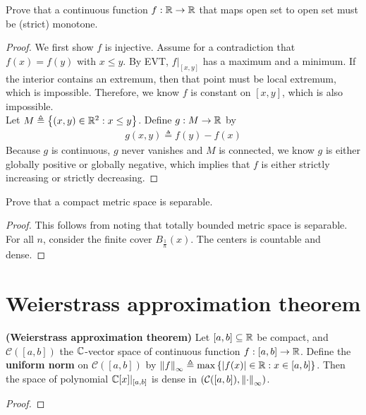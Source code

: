 \documentclass{report}
\begin{document}
\begin{question}{}{}
Prove that a continuous function $f:\mathbb{R} \rightarrow \mathbb{R}$ that maps open set to open set must be (strict) monotone.
\end{question}
\begin{proof}
We first show $f$ is injective. Assume for a contradiction that  $f(x)=f(y)$ with $x\leq y$. By EVT, $f|_{[x,y]}$ has a maximum and a minimum. If the interior contains an extremum, then that point must be local extremum, which is impossible. Therefore, we know $f$ is constant on $[x,y]$, which is also impossible. \\

Let $M\triangleq \left\{ (x,y)\in\mathbb{R}^2: x \leq y \right\}$. Define $g:M\rightarrow \mathbb{R}$ by 
\begin{align*}
g(x,y)\triangleq f(y)-f(x)
\end{align*}
Because $g$ is continuous, $g$ never vanishes and $M$ is connected, we know $g$ is either globally positive or globally negative, which implies that $f$ is either strictly increasing or strictly decreasing. 
\end{proof}

\begin{question}{}{}
Prove that a compact metric space is separable. 
\end{question}
\begin{proof}
This follows from noting that totally bounded metric space is separable. For all $n$, consider the finite cover  $B_{\frac{1}{n}}(x)$. The centers is countable and dense. 
\end{proof}


\section{Weierstrass approximation theorem} 

\begin{theorem}
\label{THWat}
\textbf{(Weierstrass approximation theorem)} Let $[a,b]\subseteq \mathbb{R}$ be compact, and $\mathcal{C}([a,b])$ the $\mathbb{C}$-vector space of continuous function $f:[a,b]\rightarrow \mathbb{R}$. Define the \textbf{uniform norm} on $\mathcal{C}([a,b])$ by $\left\| f \right\|_{\infty} \triangleq \max \left\{ \left|f(x)\right| \in\mathbb{R}: x \in [a,b] \right\}$. Then the space of polynomial $\mathbb{C}[x]|_{[a,b]}$ is dense in $\left(\mathcal{C}([a,b]), \left\| \cdot \right\|_{\infty} \right)$. 
\end{theorem}
\begin{proof}

\end{proof}
\end{document}
